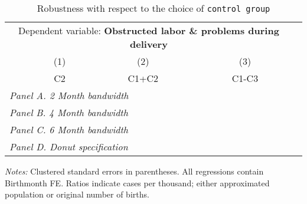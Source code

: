  \begin{table}[H] \begin{threeparttable} \centering \caption{Robustness with respect to the choice of \texttt{control group}} {\def\sym#1{\ifmmode^{#1}\else\(^{#1}\)\fi} \begin{tabular}{l*{4}{c}} \toprule \multicolumn{4}{c}{Dependent variable: \textbf{Obstructed labor \& problems during delivery}} \\ \cmidrule(lr){2-4}
            &\multicolumn{1}{c}{(1)}&\multicolumn{1}{c}{(2)}&\multicolumn{1}{c}{(3)}\\
            &\multicolumn{1}{c}{C2}&\multicolumn{1}{c}{C1+C2}&\multicolumn{1}{c}{C1-C3}\\
\midrule
 \multicolumn{4}{l}{\emph{Panel A. 2 Month bandwidth}} \\    \midrule\multicolumn{4}{l}{\emph{Panel B. 4 Month bandwidth}} \\    \midrule\multicolumn{4}{l}{\emph{Panel C. 6 Month bandwidth}} \\    \midrule\multicolumn{4}{l}{\emph{Panel D. Donut specification}} \\    
\bottomrule \end{tabular} } \begin{tablenotes} \item \scriptsize \emph{Notes:} Clustered standard errors in parentheses. All regressions contain Birthmonth FE. Ratios indicate cases per thousand; either approximated population or original number of births. \end{tablenotes} \end{threeparttable} \end{table} 
